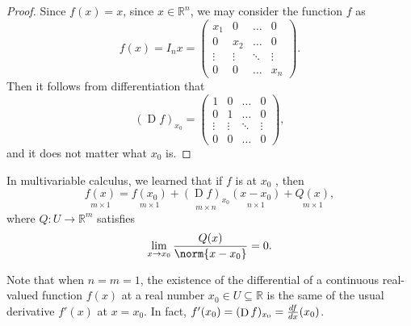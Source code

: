 \documentclass[notoc,notitlepage]{tufte-book}
\DeclareMathOperator{\D}{D}
\begin{document}
\begin{proof}
  Since $f(x) = x$, since $x \in \mathbb{R}^n$, we may consider the function $f$ as
  \begin{equation*}
    f(x) = I_n x = \begin{pmatrix}
      x_1    & 0      & \hdots & 0 \\
      0      & x_2    & \hdots & 0 \\
      \vdots & \vdots & \ddots & \vdots \\
      0      & 0      & \hdots & x_n
    \end{pmatrix}.
  \end{equation*}
  Then it follows from differentiation that
  \begin{equation*}
    (\D f)_{x_0} = \begin{pmatrix}
      1      & 0      & \hdots & 0 \\
      0      & 1      & \hdots & 0 \\
      \vdots & \vdots & \ddots & \vdots \\
      0      & 0      & \hdots & 0
    \end{pmatrix},
  \end{equation*}
  and it does not matter what $x_0$ is.
\end{proof}

\begin{note}
  In multivariable calculus, we learned that if $f$ is  at $x_0$
  , then
  \begin{equation*}
    \underset{m \times 1}{f(x)}
      = \underset{m \times 1}{f(x_0)}
        + \underset{m \times n}{(\D f)_{x_0}} \underset{n \times 1}{(x - x_0)}
        + \underset{m \times 1}{Q(x)},
  \end{equation*}
  where $Q : U \to \mathbb{R}^m$ satisfies
  \begin{equation*}
    \lim_{x \to x_0} \frac{Q(x)}{\norm{x - x_0}} = 0.
  \end{equation*}
\end{note}

\begin{note}
  Note that when $n = m = 1$, the existence of the differential of a continuous
  real-valued function $f(x)$ at a real number $x_0 \in U \subseteq \mathbb{R}$
  is the same of the usual derivative $f'(x)$ at $x = x_0$. In fact,
  $f'(x_0) = (\D f)_{x_0} = \frac{\dif{f}}{\dif{x}}(x_0)$.
\end{note}
\end{document}

